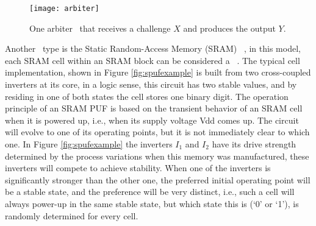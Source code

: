 \begin{figure}[!ht]
	\centering
	\texttt{[image: arbiter]}
	\caption{One arbiter \puf~that receives a challenge $X$ and produces the output $Y$.}
	\label{fig:arbiterpuf}
\end{figure}

 Another \puf~type is the Static Random-Access Memory (SRAM) \puf~\cite{Leest2012}, in this model, each SRAM cell within an SRAM block can be considered a \puf~. The typical cell implementation, shown in Figure \ref{fig:spufexample} is built from two cross-coupled inverters at its core,%
in a logic sense, this circuit has two stable values, and by residing in one of both states the cell stores one binary digit.%
The operation principle of an SRAM PUF is based on the transient behavior of an SRAM cell when it is powered up, i.e., when its supply voltage Vdd comes up. The circuit will evolve to one of its operating points, but it is not immediately clear to which one. In Figure   \ref{fig:spufexample} the inverters $I_1$ and $I_2$ have its drive strength determined by the process variations when this memory was manufactured, these inverters will compete to achieve stability. When one of the inverters is significantly stronger than the other one, the preferred initial operating point will be a stable state, and the preference will be very distinct, i.e., such a cell will always power-up in the same stable state, but which state this is (‘0’ or ‘1’), is randomly determined for every cell.



